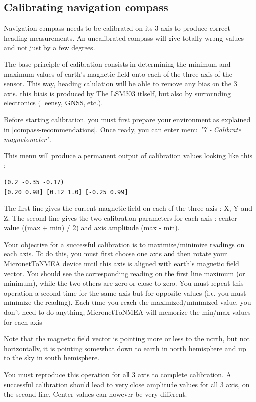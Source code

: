 \documentclass{report}
\begin{document}
\subsection{Calibrating navigation compass}

Navigation compass needs to be calibrated on its 3 axis to produce correct heading measurements. An uncalibrated compass will give totally wrong values and not just by a few degrees.

The base principle of calibration consists in determining the minimum and maximum values of earth's magnetic field onto each of the three axis of the sensor. This way, heading calulation will be able to remove any bias on the 3 axis. this biais is produced by The LSM303 itlself, but also by surrounding electronics (Teensy, GNSS, etc.).

Before starting calibration, you must first prepare your environment as explained in \ref{compass-recommendations}. Once ready, you can enter menu \emph{"7 - Calibrate magnetometer"}.

This menu will produce a permanent output of calibration values looking like this :

\begin{verbatim}
(0.2 -0.35 -0.17)
[0.20 0.98] [0.12 1.0] [-0.25 0.99]
\end{verbatim}

The first line gives the current magnetic field on each of the three axis : X, Y and Z.
The second line gives the two calibration parameters for each axis : center value ((max + min) / 2) and axis amplitude (max - min).

Your objective for a successful calibration is to maximize/minimize readings on each axis. To do this, you must first choose one axis and then rotate your MicronetToNMEA device until this axis is aligned with earth's magnetic field vector. You should see the corresponding reading on the first line maximum (or minimum), while the two others are zero or close to zero.
You must repeat this operation a second time for the same axis but for opposite values (i.e. you must minimize the reading). Each time you reach the maximized/minimized value, you don't need to do anything, MicronetToNMEA will memorize the min/max values for each axis.

Note that the magnetic field vector is pointing more or less to the north, but not horizontally, it is pointing somewhat down to earth in north hemisphere and up to the sky in south hemisphere.

You must reproduce this operation for all 3 axis to complete calibration.
A successful calibration should lead to very close amplitude values for all 3 axis, on the second line. Center values can however be very different.
\end{document}
